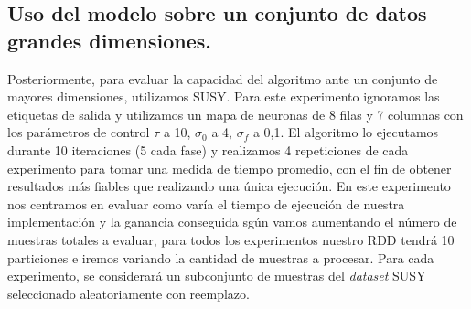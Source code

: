 \subsection{Uso del modelo sobre un conjunto de datos grandes dimensiones.}
Posteriormente, para evaluar la capacidad del algoritmo ante un conjunto de mayores dimensiones, utilizamos SUSY. Para este experimento ignoramos las etiquetas de salida y utilizamos un mapa de neuronas de 8 filas y 7 columnas con los parámetros de control $\tau$ a 10, $\sigma_0$ a 4, $\sigma_f$ a 0,1. El algoritmo lo ejecutamos durante 10 iteraciones (5 cada fase) y realizamos 4 repeticiones de cada experimento para tomar una medida de tiempo promedio, con el fin de obtener resultados más fiables que realizando una única ejecución. En este experimento nos centramos en evaluar como varía el tiempo de ejecución de nuestra implementación y la ganancia conseguida sgún vamos aumentando el número de muestras totales a evaluar, para todos los experimentos nuestro RDD tendrá 10 particiones e iremos variando la cantidad de muestras a procesar. Para cada experimento, se considerará un subconjunto de muestras del \textit{dataset} SUSY seleccionado aleatoriamente con reemplazo.\\

